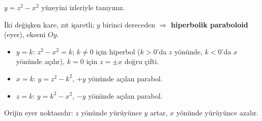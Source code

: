 \begin{soru}
$y=z^2-x^2$ yüzeyini izleriyle tanıyınız.
\end{soru}
\begin{cevap}
İki değişken kare, zıt işaretli; $y$ birinci dereceden $\Rightarrow$ \textbf{hiperbolik paraboloid} (eyer), ekseni $Oy$.
\begin{itemize}
  \item $y=k$: $z^2-x^2=k$; $k\neq0$ için hiperbol ($k>0$'da $z$ yönünde, $k<0$'da $x$ yönünde açılır), $k=0$ için $z=\pm x$ doğru çifti.
  \item $x=k$: $y=z^2-k^2$, $+y$ yönünde açılan parabol.
  \item $z=k$: $y=k^2-x^2$, $-y$ yönünde açılan parabol.
\end{itemize}
Orijin eyer noktasıdır: $z$ yönünde yürüyünce $y$ artar, $x$ yönünde yürüyünce azalır.
\end{cevap}
